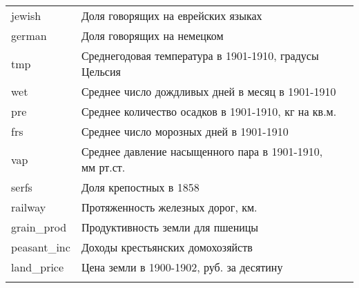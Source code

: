 \begin{longtable}{p{} p{} p{}}
	jewish          & Доля говорящих на еврейских языках                           &                                  \\
	german          & Доля говорящих на немецком                                   &                                  \\
	tmp             & Среднегодовая температура в 1901-1910, градусы Цельсия       & \cite{harris_version_2020}       \\
	wet             & Среднее число дождливых дней в месяц в 1901-1910             &                                  \\
	pre             & Среднее количество осадков в 1901-1910, кг на кв.м.          &                                  \\
	frs             & Среднее число морозных дней в 1901-1910                      &                                  \\
	vap             & Среднее давление насыщенного пара в 1901-1910, мм рт.ст.     &                                  \\
	serfs           & Доля крепостных в 1858                                       & \cite{markevich_abolition_2018, serfs_1861}  \\
	railway         & Протяженность железных дорог, км.                            &                                  \\
	grain\_prod     & Продуктивность земли для пшеницы                             &                                  \\
	peasant\_inc    & Доходы крестьянских домохозяйств                             & \cite{lindert_inequality_2014}   \\
	land\_price     & Цена земли в 1900-1902, руб. за десятину                     &                                  \\* 
	\bottomrule
	\label{table:vars}
\end{longtable}